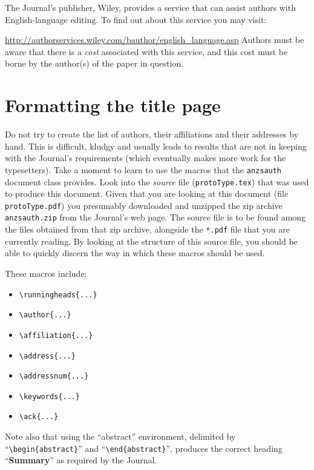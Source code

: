 \documentclass[times, doublespace]{anzsauth}
\begin{document}
The Journal's publisher, Wiley, provides a service that can assist
authors with English-language editing.  To find out about this
service you may visit:

{\small
\url{http://authorservices.wiley.com/bauthor/english_language.asp}
}
\noindent
Authors must be aware that there is a \emph{cost} associated with
this service, and this cost must be borne by the author(s) of the
paper in question.

\section{Formatting the title page}
\label{sec:titPage}

Do not try to create the list of authors, their affiliations
and their addresses by hand.  This is difficult, kludgy and
usually leads to results that are not in keeping with the
Journal's requirements (which eventually makes more work for
the typesetters).  Take a moment to learn to use the macros
that the \texttt{anzsauth} document class provides.  Look into
the \emph{source} file (\texttt{protoType.tex}) that was used to
produce this document.  Given that you are looking at this document
(file \texttt{protoType.pdf}) you presumably downloaded and unzipped
the zip archive \texttt{anzsauth.zip} from the Journal's web page.
The source file is to be found among the files obtained from
that zip archive, alongside the \texttt{*.pdf} file that you are
currently reading.  By looking at the structure of this source file,
you should be able to quickly discern the way in which these macros
should be used.

These macros include:
\begin{itemize}
\item \verb!\runningheads{...}!
\item \verb!\author{...}!
\item \verb!\affiliation{...}!
\item \verb!\address{...}!
\item \verb!\addressnum{...}!
\item \verb!\keywords{...}!
\item \verb!\ack{...}!
\end{itemize}
Note also that using the ``abstract'' environment, delimited by
``\verb!\begin{abstract}!'' and ``\verb!\end{abstract}!'',
produces the correct heading ``\textbf{Summary}'' as required by
the Journal.
\end{document}
